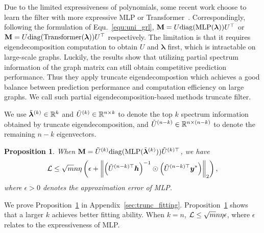 \documentclass{article} %
\def\vlambda{{\bm\lambda}}
\newtheorem{proposition}{\textbf{Proposition}} %
\begin{document}
	Due to the limited expressiveness of polynomials, some recent work choose to learn the filter with more expressive MLP or Transformer~\citep{lingam2022piece,yang2022spectrum,bo2022specformer}.
	Correspondingly, following the formulation of Equ.~\ref{equ:uni_grl}, $\rmM=U\mathrm{diag}(\mathrm{MLP}(\vlambda))U^{\top}$ or $\rmM=U\mathrm{diag}(\mathrm{Transformer}(\vlambda))U^{\top}$ respectively.
	The limitation is that it requires eigendecomposition computation to obtain $U$ and $\vlambda$ first, which is intractable on large-scale graphs.
	Luckily, the results show that utilizing partial spectrum information of the graph matrix can still obtain competitive prediction performance.
	Thus they apply truncate eigendecompostion which achieves a good balance between prediction performance and computation efficiency on large graphs.
	We call such partial eigendecomposition-based methods truncate filter.
	
	We use $\tilde\vlambda^{(k)}\in\sR^k$ and $\tilde U^{(k)}\in{\mathbb{R}}^{n\times k}$ to denote the top $k$ spectrum information obtained by truncate eigendecomposition, and $\tilde U^{(n-k)}\in{\mathbb{R}}^{n\times(n-k)}$ to denote the remaining $n-k$ eigenvectors.
	\begin{proposition}
		\label{prop:trunc_fitting}
		When $\rmM=\tilde U^{(k)}\mathrm{diag}(\mathrm{MLP}(\tilde\vlambda^{(k)}))\tilde U^{(k)\top}$, we have
		\begin{equation}
			\label{equ:bound_trunc}
			\begin{aligned}
				{\mathcal{L}}\leq\sqrt{m}n\eta\left(\epsilon+\left\|\left(\tilde U^{(n-k)\top}{\bm{h}}\right)^{-1}\odot\left(\tilde U^{(n-k)\top}{\bm{y}}^*\right)\right\|_2\right),
			\end{aligned}
		\end{equation}
		where $\epsilon>0$ denotes the approximation error of MLP.
	\end{proposition}
	We prove Proposition~\ref{prop:trunc_fitting} in Appendix~\ref{sec:trunc_fitting}.
	Proposition~\ref{prop:trunc_fitting} shows that a larger $k$ achieves better fitting ability.
	When $k=n$, ${\mathcal{L}}\leq\sqrt{m}n\eta\epsilon$, where $\epsilon$ relates to the expressiveness of MLP.
	
\end{document}
